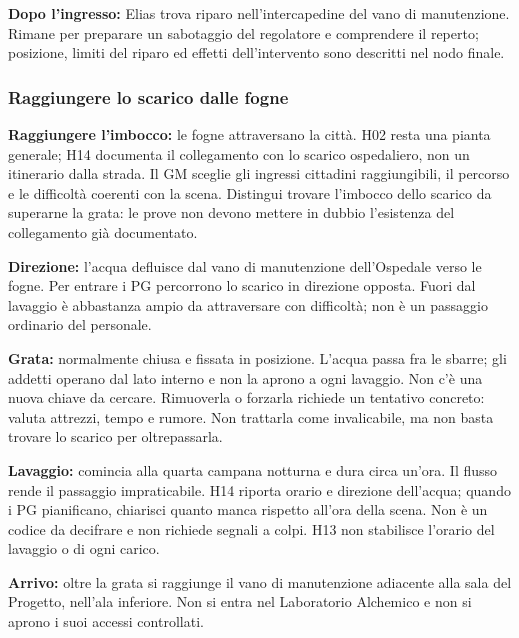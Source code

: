 \documentclass[11pt,a4paper]{article}
\begin{document}
\textbf{Dopo l'ingresso:} Elias trova riparo nell'intercapedine del vano di manutenzione. Rimane per preparare un sabotaggio del regolatore e comprendere il reperto; posizione, limiti del riparo ed effetti dell'intervento sono descritti nel nodo finale.

\subsubsection{Raggiungere lo scarico dalle fogne}
\textbf{Raggiungere l'imbocco:} le fogne attraversano la città. H02 resta una pianta generale; H14 documenta il collegamento con lo scarico ospedaliero, non un itinerario dalla strada. Il GM sceglie gli ingressi cittadini raggiungibili, il percorso e le difficoltà coerenti con la scena. Distingui trovare l'imbocco dello scarico da superarne la grata: le prove non devono mettere in dubbio l'esistenza del collegamento già documentato.

\textbf{Direzione:} l'acqua defluisce dal vano di manutenzione dell'Ospedale verso le fogne. Per entrare i PG percorrono lo scarico in direzione opposta. Fuori dal lavaggio è abbastanza ampio da attraversare con difficoltà; non è un passaggio ordinario del personale.

\textbf{Grata:} normalmente chiusa e fissata in posizione. L'acqua passa fra le sbarre; gli addetti operano dal lato interno e non la aprono a ogni lavaggio. Non c'è una nuova chiave da cercare. Rimuoverla o forzarla richiede un tentativo concreto: valuta attrezzi, tempo e rumore. Non trattarla come invalicabile, ma non basta trovare lo scarico per oltrepassarla.

\textbf{Lavaggio:} comincia alla quarta campana notturna e dura circa un'ora. Il flusso rende il passaggio impraticabile. H14 riporta orario e direzione dell'acqua; quando i PG pianificano, chiarisci quanto manca rispetto all'ora della scena. Non è un codice da decifrare e non richiede segnali a colpi. H13 non stabilisce l'orario del lavaggio o di ogni carico.

\textbf{Arrivo:} oltre la grata si raggiunge il vano di manutenzione adiacente alla sala del Progetto, nell'ala inferiore. Non si entra nel Laboratorio Alchemico e non si aprono i suoi accessi controllati.
\end{document}
